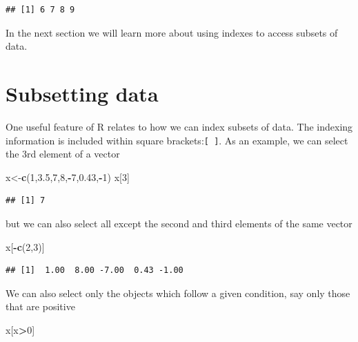 \documentclass[
]{article}
\newenvironment{Shaded}{\begin{snugshade}}{\end{snugshade}}
\newcommand{\DecValTok}[1]{\textcolor[rgb]{0.00,0.00,0.81}{#1}}
\newcommand{\FloatTok}[1]{\textcolor[rgb]{0.00,0.00,0.81}{#1}}
\newcommand{\FunctionTok}[1]{\textcolor[rgb]{0.13,0.29,0.53}{\textbf{#1}}}
\newcommand{\NormalTok}[1]{#1}
\newcommand{\OtherTok}[1]{\textcolor[rgb]{0.56,0.35,0.01}{#1}}
\newcommand{\SpecialCharTok}[1]{\textcolor[rgb]{0.81,0.36,0.00}{\textbf{#1}}}
\begin{document}
\begin{verbatim}
## [1] 6 7 8 9
\end{verbatim}

In the next section we will learn more about using indexes to access
subsets of data.

\section{Subsetting data}\label{subsetting-data}

One useful feature of R relates to how we can index subsets of data. The
indexing information is included within square
brackets:\texttt{{[}\ {]}}. As an example, we can select the 3rd element
of a vector

\begin{Shaded}
\begin{Highlighting}[]
\NormalTok{x}\OtherTok{\textless{}{-}}\FunctionTok{c}\NormalTok{(}\DecValTok{1}\NormalTok{,}\FloatTok{3.5}\NormalTok{,}\DecValTok{7}\NormalTok{,}\DecValTok{8}\NormalTok{,}\SpecialCharTok{{-}}\DecValTok{7}\NormalTok{,}\FloatTok{0.43}\NormalTok{,}\SpecialCharTok{{-}}\DecValTok{1}\NormalTok{)}
\NormalTok{x[}\DecValTok{3}\NormalTok{]}
\end{Highlighting}
\end{Shaded}

\begin{verbatim}
## [1] 7
\end{verbatim}

but we can also select all except the second and third elements of the
same vector

\begin{Shaded}
\begin{Highlighting}[]
\NormalTok{x[}\SpecialCharTok{{-}}\FunctionTok{c}\NormalTok{(}\DecValTok{2}\NormalTok{,}\DecValTok{3}\NormalTok{)]}
\end{Highlighting}
\end{Shaded}

\begin{verbatim}
## [1]  1.00  8.00 -7.00  0.43 -1.00
\end{verbatim}

We can also select only the objects which follow a given condition, say
only those that are positive

\begin{Shaded}
\begin{Highlighting}[]
\NormalTok{x[x}\SpecialCharTok{\textgreater{}}\DecValTok{0}\NormalTok{]}
\end{Highlighting}
\end{Shaded}
\end{document}
